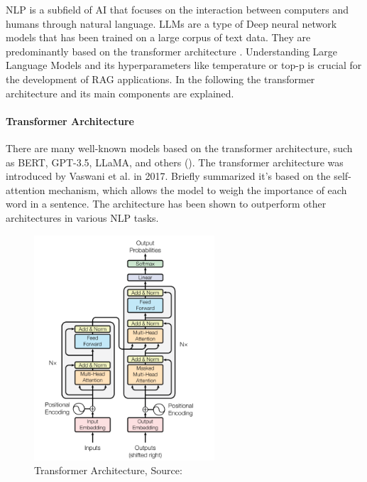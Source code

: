 

NLP is a subfield of AI that focuses on the interaction between computers and humans through natural language. LLMs are a type of Deep neural network models that has been trained on a large corpus of text data. They are predominantly based on the transformer architecture \cite{Wolf.09.10.2019}. Understanding Large Language Models and its hyperparameters like temperature or top-p is crucial for the development of RAG applications. In the following the transformer architecture and its main components are explained.

\paragraph{Transformer Architecture}
There are many well-known models based on the transformer architecture, such as BERT, GPT-3.5, LLaMA, and others (\cite{Yin.2024}). The transformer architecture was introduced by Vaswani et al. in 2017. Briefly summarized it's based on the self-attention mechanism, which allows the model to weigh the importance of each word in a sentence. The architecture has been shown to outperform other architectures in various NLP tasks.

\begin{figure}[h!]
    \centering
    \includegraphics[width=0.6\textwidth]{images/transformers_architecture.png}
    \caption{Transformer Architecture, Source: \cite{vaswani2023attentionneed}}
    \label{fig:transformer_architecture}
\end{figure}

